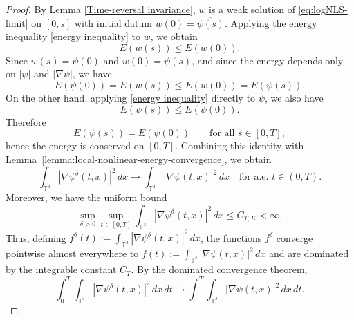 \documentclass[10pt,a4paper]{amsart}
\begin{document}
\begin{proof}
By Lemma \ref{Time-reversal invariance},
 $w$ is a weak solution of  \eqref{eq:logNLS-limit} on $[0,s]$ with initial datum
$w(0)=\overline{\psi(s)}$. Applying the energy inequality \eqref{energy inequality} to $w$, we obtain
\[
E(w(s)) \le E(w(0)).
\]
Since $w(s)=\overline{\psi(0)}$ and $w(0)=\overline{\psi(s)}$, and since the energy depends only on
$|\psi|$ and $|\nabla \psi|$, we have
\[
E(\psi(0)) = E(w(s)) \le E(w(0)) = E(\psi(s)).
\]
On the other hand, applying \eqref{energy inequality} directly to $\psi$, we also have
\[
E(\psi(s)) \le E(\psi(0)).
\]
Therefore
\[
E(\psi(s)) = E(\psi(0)) \qquad \text{for all } s\in [0,T],
\]
hence the energy is conserved on $[0,T]$. Combining this identity with Lemma~\ref{lemma:local-nonlinear-energy-convergence}, we obtain
\[
\int_{\mathbb{T}^3} |\nabla\psi^\delta(t,x)|^2\,dx \to \int_{\mathbb{T}^3} |\nabla\psi(t,x)|^2\,dx
\quad \text{for a.e. } t\in(0,T).
\]
Moreover, we have the uniform bound
\[
\sup_{\delta>0}\sup_{t\in[0,T]} \int_{\mathbb{T}^3} |\nabla\psi^\delta(t,x)|^2\,dx \le C_{T,K} < \infty.
\]
Thus, defining \(f^\delta(t) := \int_{\mathbb{T}^3} |\nabla\psi^\delta(t,x)|^2\,dx\), the functions \(f^\delta\) converge pointwise almost everywhere to \(f(t) := \int_{\mathbb{T}^3} |\nabla\psi(t,x)|^2\,dx\) and are dominated by the integrable constant \(C_{T}\). By the dominated convergence theorem,
\[
\int_0^T\int_{\mathbb{T}^3} |\nabla\psi^\delta(t,x)|^2\,dx\,dt
\to
\int_0^T\int_{\mathbb{T}^3} |\nabla\psi(t,x)|^2\,dx\,dt.
\]










\end{proof}
\end{document}
